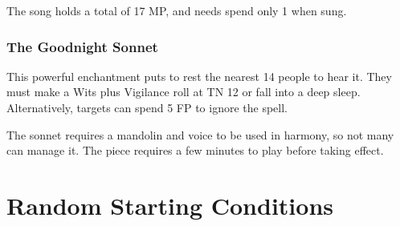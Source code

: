\begin{multicols}{2}
The song holds a total of 17 MP, and needs spend only 1 when sung.

\subsubsection{The Goodnight Sonnet}

This powerful enchantment puts to rest the nearest 14 people to hear it.  They must make a Wits plus Vigilance roll at TN 12 or fall into a deep sleep.  Alternatively, targets can spend 5 FP to ignore the spell.

The sonnet requires a mandolin and voice to be used in harmony, so not many can manage it.  The piece requires a few minutes to play before taking effect.

\end{multicols}


\section{Random Starting Conditions}

